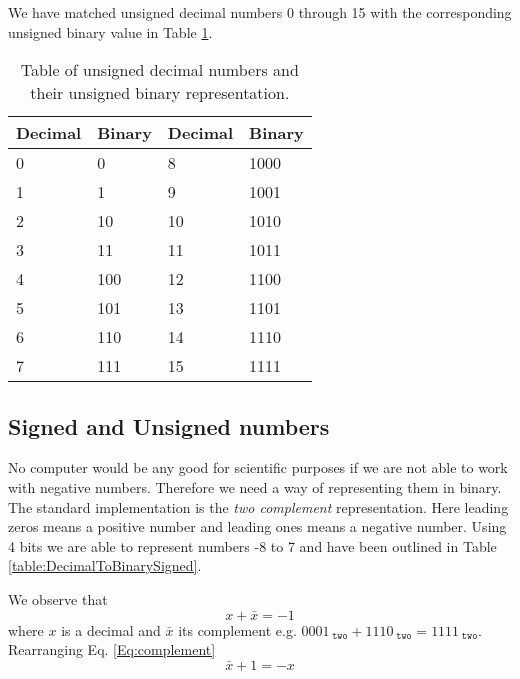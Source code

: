     We have matched unsigned decimal numbers 0 through 15 with the corresponding unsigned binary value in Table \ref{table:DecimalToBinaryUnsigned}.
    
    \begin{table}[h!]
        \centering
        \begin{tabular}{|l|l||l|l|}
        	\hline
        	Decimal & Binary & Decimal & Binary \\ \hline
        	0       & 0      & 8       & 1000   \\
        	1       & 1      & 9       & 1001   \\
        	2       & 10     & 10      & 1010   \\
        	3       & 11     & 11      & 1011   \\
        	4       & 100    & 12      & 1100   \\
        	5       & 101    & 13      & 1101   \\
        	6       & 110    & 14      & 1110   \\
        	7       & 111    & 15      & 1111   \\ \hline
        \end{tabular}
        \caption{Table of unsigned decimal numbers and their unsigned binary representation.}
        \label{table:DecimalToBinaryUnsigned}
    \end{table} 
    
    \subsection{Signed and Unsigned numbers}
        No computer would be any good for scientific purposes if we are not able to work with negative numbers. Therefore we need a way of representing them in binary. The standard implementation is the \textit{two complement} representation. Here leading zeros means a positive number and leading ones means a negative number. Using 4 bits we are able to represent numbers -8 to 7 and have been outlined in Table \ref{table:DecimalToBinarySigned}. 
        
        We observe that 
        \begin{equation}\label{Eq:complement}
            x + \bar{x} = -1
        \end{equation}
        where $x$ is a decimal and $\bar{x}$ its complement e.g. $0001_{\; \texttt{two}}+1110_{\; \texttt{two}}=1111_{\; \texttt{two}}$. Rearranging Eq. \ref{Eq:complement}
        \begin{equation}
        \bar{x} + 1 = -x
        \end{equation}
        
